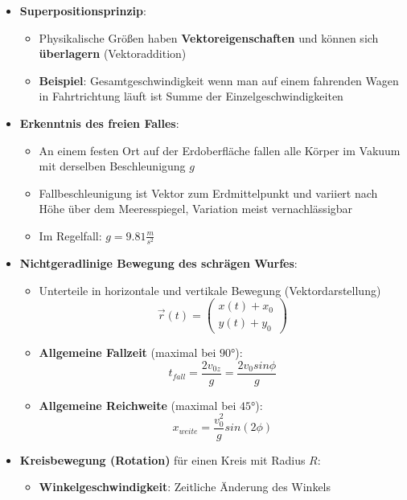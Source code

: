 \begin{itemize}
\begin{itemize}
	\end{itemize}
	\item \textbf{Superpositionsprinzip}:
	\begin{itemize}
		\item Physikalische Größen haben \textbf{Vektoreigenschaften} und können sich \textbf{überlagern} (Vektoraddition)
		\item \textbf{Beispiel}: Gesamtgeschwindigkeit wenn man auf einem fahrenden Wagen in Fahrtrichtung läuft ist Summe der Einzelgeschwindigkeiten
	\end{itemize}
	\item \textbf{Erkenntnis des freien Falles}:
	\begin{itemize}
		\item An einem festen Ort auf der Erdoberfläche fallen alle Körper im Vakuum mit derselben Beschleunigung $g$
		\item Fallbeschleunigung ist Vektor zum Erdmittelpunkt und variiert nach Höhe über dem Meeresspiegel, Variation meist vernachlässigbar
		\item Im Regelfall: $g = 9.81 \frac{m}{s^2}$
	\end{itemize}
	\newpage
	\item \textbf{Nichtgeradlinige Bewegung des schrägen Wurfes}:
	\begin{itemize}
		\item Unterteile in horizontale und vertikale Bewegung (Vektordarstellung)
		\begin{equation}
			\vec{r}(t) = \begin{pmatrix}
				x(t) + x_0\\
				y(t) + y_0
			\end{pmatrix}
		\end{equation}
		\item \textbf{Allgemeine Fallzeit} (maximal bei $\ang{90}$):
		\begin{equation}
			t_{fall} = \frac{2v_{0z}}{g} = \frac{2v_{0}sin\phi}{g}
		\end{equation}
		\item \textbf{Allgemeine Reichweite} (maximal bei $\ang{45}$):
		\begin{equation}
			x_{weite} = \frac{v_{0}^2}{g}sin(2\phi)
		\end{equation}
	\end{itemize}
	\item \textbf{Kreisbewegung (Rotation)} für einen Kreis mit Radius $R$:
	\begin{itemize}
		\item \textbf{Winkelgeschwindigkeit}: Zeitliche Änderung des Winkels

\end{itemize}
\end{itemize}
